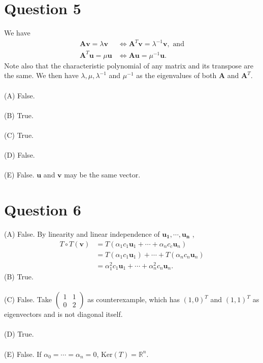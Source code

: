 \documentclass{article}
\begin{document}
\section*{Question 5}
We have 
\begin{align*}
    \mathbf{A} \mathbf{v} = \lambda\mathbf{v} &\iff \mathbf{A}^T \mathbf{v} = \lambda^{-1}\mathbf{v}, \text{ and} \\
    \mathbf{A}^T \mathbf{u} = \mu\mathbf{u} &\iff \mathbf{A} \mathbf{u} = \mu^{-1}\mathbf{u}.
\end{align*}
Note also that the characteristic polynomial of any matrix and its transpose are the same. We then have $\lambda, \mu, \lambda^{-1}$ and $\mu^{-1}$ as the eigenvalues of both $\mathbf{A}$ and $\mathbf{A}^T$. \\\\
(A) False. \\\\
(B) True. \\\\
(C) True. \\\\
(D) False. \\\\
(E) False. $\mathbf{u}$ and $\mathbf{v}$ may be the same vector.

\section*{Question 6}
(A) False. By linearity and linear independence of $\mathbf{u_1}, \cdots ,\mathbf{u_n}$ ,
\begin{align*}
    T\circ T(\mathbf{v}) &= T(\alpha_1c_1\mathbf{u}_1 + \cdots + \alpha_nc_c\mathbf{u}_n) \\
    &= T(\alpha_1c_1\mathbf{u}_1) + \cdots + T(\alpha_n c_n\mathbf{u}_n) \\
    &= \alpha_1^2 c_1 \mathbf{u}_1 + \cdots + \alpha_n^2 c_n\mathbf{u}_n. 
\end{align*}
(B) True. \\\\
(C) False. Take $\begin{pmatrix}
    1 & 1 \\ 0 & 2
\end{pmatrix}$ as counterexample, which has $(1,0)^T$ and $(1,1)^T$ as eigenvectors and is not diagonal itself. \\\\
(D) True.\\\\
(E) False. If $\alpha_0 = \cdots = \alpha_n = 0$, $\text{Ker}(T) = \mathbb{R}^n$.\\\\
\end{document}
